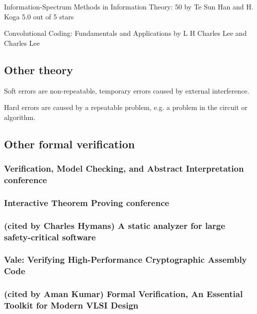 \documentclass{article}
\begin{document}
Information-Spectrum Methods in Information Theory: 50
by Te Sun Han and H. Koga
5.0 out of 5 stars

Convolutional Coding: Fundamentals and Applications
by L H Charles Lee and Charles Lee


\subsection{Other theory}

Soft errors are non-repeatable, temporary errors caused by external interference.

Hard errors are caused by a repeatable problem, e.g. a problem in the circuit or algorithm.


\subsection{Other formal verification}

\subsubsection{Verification, Model Checking, and Abstract Interpretation conference}

\subsubsection{Interactive Theorem Proving conference}

\subsubsection{(cited by Charles Hymans) A static analyzer for large safety-critical software}


\subsubsection{Vale: Verifying {High-Performance} Cryptographic Assembly Code}

\subsubsection{(cited by Aman Kumar) Formal Verification, An Essential Toolkit for Modern VLSI Design} 
\end{document}
